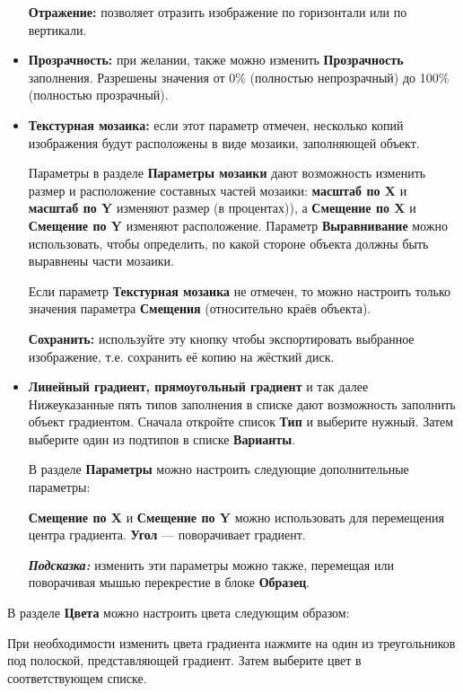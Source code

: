 \documentclass[a4paper,10pt]{article}
\begin{document}
\begin{itemize}
  \textbf{Отражение:} позволяет отразить изображение по горизонтали или по вертикали.
  
  \item \textbf{Прозрачность:} при желании, также можно изменить \textbf{Прозрачность} заполнения. Разрешены значения от 0\% (полностью непрозрачный) до 100\% (полностью прозрачный).
  \item \textbf{Текстурная мозаика:} если этот параметр отмечен, несколько копий изображения будут расположены в виде мозаики, заполняющей объект.
  
  Параметры в разделе \textbf{Параметры мозаики} дают возможность изменить размер и расположение составных частей мозаики: \textbf{масштаб по X} и \textbf{масштаб по Y} изменяют размер (в процентах)), а \textbf{Смещение по X} и \textbf{Смещение по Y} изменяют расположение. Параметр \textbf{Выравнивание} можно использовать, чтобы определить, по какой стороне объекта должны быть выравнены части мозаики.
  
  Если параметр \textbf{Текстурная мозаика} не отмечен, то можно настроить только значения параметра \textbf{Смещения} (относительно краёв объекта).
  
  \textbf{Сохранить:} используйте эту кнопку чтобы экспортировать выбранное изображение, т.е. сохранить её копию на жёсткий диск.
  \item \textbf{Линейный градиент, прямоугольный градиент} и так далее\\
  Нижеуказанные пять типов заполнения в списке дают возможность заполнить объект градиентом. Сначала откройте список \textbf{Тип} и выберите нужный. Затем выберите один из подтипов в списке \textbf{Варианты}.
  
  В разделе \textbf{Параметры} можно настроить следующие дополнительные параметры:
  
  \textbf{Смещение по X} и \textbf{Смещение по Y} можно использовать для перемещения центра градиента. \textbf{Угол} --- поворачивает градиент.
  
  \begin{mdframed}[backgroundcolor=blue!10]
\textbf{\textit{Подсказка:}} изменить эти параметры можно также, перемещая или поворачивая мышью перекрестие в блоке \textbf{Образец}.
\end{mdframed}
\end{itemize}

В разделе \textbf{Цвета} можно настроить цвета следующим образом:

При необходимости изменить цвета градиента нажмите на один из треугольников под полоской, представляющей градиент. Затем выберите цвет в соответствующем списке.
\end{document}
